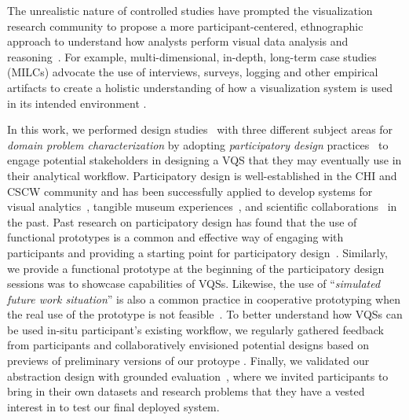 {  \par The unrealistic nature of controlled studies have prompted the visualization research community to propose a more participant-centered, ethnographic approach to understand how analysts perform visual data analysis and reasoning~\cite{Plaisant2004,lam2012empirical,shneiderman2006strategies,munzner2009nested,Sedlmair2012}. For example, multi-dimensional, in-depth, long-term case studies (MILCs) advocate the use of interviews, surveys, logging and other empirical artifacts to create a holistic understanding of how a visualization system is used in its intended environment \cite{shneiderman2006strategies}. 
  \par In this work, we performed design studies~\cite{lam2012empirical,shneiderman2006strategies,Sedlmair2012} with three different subject areas for \textit{domain problem characterization} by adopting \emph{participatory design} practices~\cite{Gould1983,Muller1993} to engage potential stakeholders in designing a VQS that they may eventually use in their analytical workflow. Participatory design is well-established in the CHI and CSCW community and has been successfully applied to develop systems for visual analytics~\cite{Aragon2008,Chuang2012}, tangible museum experiences~\cite{Ciolfi2016}, and scientific collaborations~\cite{Poon2008,Chen2016} in the past. Past research on participatory design has found that the use of functional prototypes is a common and effective way of engaging with participants and providing a starting point for participatory design~\cite{Ciolfi2016}. Similarly, we provide a functional prototype at the beginning of the participatory design sessions was to showcase capabilities of VQSs.  Likewise, the use of ``\textit{simulated future work situation}'' is also a common practice in cooperative prototyping when the real use of the prototype is not feasible~\cite{Grnbak1991}. To better understand how VQSs can be used in-situ participant's existing workflow, we regularly gathered feedback from participants and collaboratively envisioned potential designs based on previews of preliminary versions of our protoype \zvpp. Finally, we validated our abstraction design with grounded evaluation~\cite{Plaisant2004,Isenberg2008}, where we invited participants to bring in their own datasets and research problems that they have a vested interest in to test our final deployed system.
}
